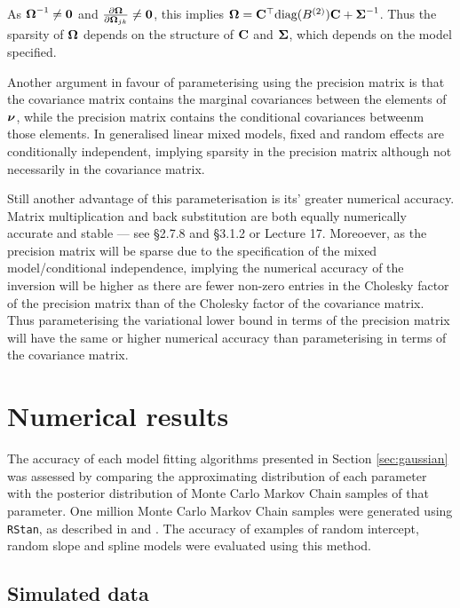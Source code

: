As ${\boldsymbol \Omega}^{-1} \ne {\bf0}$ and $\tfrac{\partial {\boldsymbol\Omega}}{\partial {\boldsymbol\Omega}_{jk}} \ne {\bf0}$, this implies
${\boldsymbol \Omega} = {\bf C}^\top \text{diag}(B^{(2)}) {\bf C} + {\boldsymbol \Sigma}^{-1}$. Thus the sparsity of ${\boldsymbol \Omega}$ depends on the
structure of ${\bf C}$ and ${\boldsymbol \Sigma}$, which depends on the model specified.

Another argument in favour of parameterising using the precision matrix is that the covariance matrix contains
the marginal covariances between the elements of ${\boldsymbol \nu}$, while the precision matrix contains the conditional
covariances betweenm those elements. In generalised linear mixed models, fixed and random effects are
conditionally independent, implying sparsity in the precision matrix although not necessarily in the
covariance matrix.

Still another advantage of this parameterisation is its' greater numerical accuracy.
Matrix multiplication and back substitution are both equally numerically accurate and stable --- see
\cite{Golub:1996:MC:248979} \S2.7.8 and \S3.1.2 or \cite{trefethen97} Lecture 17. Moreoever, as the precision
matrix will be sparse due to the specification of the mixed model/conditional independence, implying the
numerical accuracy of the inversion will be higher as there are fewer non-zero entries in the Cholesky factor
of the precision matrix than of the Cholesky factor of the covariance matrix. Thus parameterising the
variational lower bound in terms of the precision matrix will have the same or higher numerical accuracy than
parameterising in terms of the covariance matrix.

\section{Numerical results}
\label{sec:results}
		
The accuracy of each model fitting algorithms presented in Section \ref{sec:gaussian} was assessed by
comparing the approximating distribution of each parameter with the posterior distribution of Monte Carlo
Markov Chain samples of that parameter. One million Monte Carlo Markov Chain samples were generated using
\texttt{RStan}, as described in \cite{Carpenter2016} and \cite{StanDevelopmentTeam2016}. The accuracy of
examples of random intercept, random slope and spline models were evaluated using this method.
		
\subsection{Simulated data}
		
